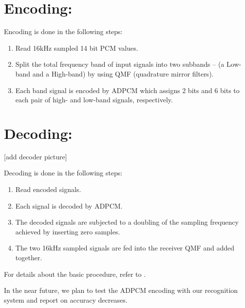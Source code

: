 \section{Encoding:}

Encoding is done in the following steps:

\begin{enumerate}
\item Read 16kHz sampled 14 bit PCM values. 

\item Split the total frequency band of input signals into two 
  subbands -- (a Low-band and a High-band) by using QMF
(quadrature mirror filters).

\item Each band signal is encoded by ADPCM which 
   assigns 2 bits and 6 bits to each pair of high- and low-band signals, 
   respectively.
\end{enumerate}

\section{Decoding:}

[add decoder picture]

Decoding is done in the following steps:
\begin{enumerate}
\item Read encoded signals.

\item Each signal is decoded by ADPCM.

\item The decoded signals are subjected to a doubling of the sampling 
   frequency achieved by inserting zero samples. 

\item The two 16kHz sampled signals are fed into the receiver QMF and 
added together.

\end{enumerate}

For details about the basic procedure, refer to 
\cite{Papamichalis87,JayantandNoll84,IwadareandNishitani88}.

In the near future, we plan to test the ADPCM encoding with our recognition
system and report on accuracy decreases.






